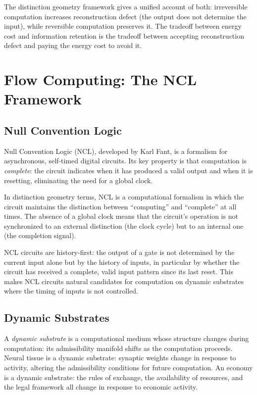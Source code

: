 \documentclass[12pt,a4paper]{book}
\theoremstyle{remark}
\theoremstyle{definition}
\begin{document}
The distinction geometry framework gives a unified account of both:
irreversible computation increases reconstruction defect (the output
does not determine the input), while reversible computation preserves
it. The tradeoff between energy cost and information retention is the
tradeoff between accepting reconstruction defect and paying the energy
cost to avoid it.

\chapter{Flow Computing: The NCL Framework}

\section{Null Convention Logic}

Null Convention Logic (NCL), developed by Karl Fant, is a formalism for
asynchronous, self-timed digital circuits. Its key property is that
computation is \emph{complete}: the circuit indicates when it has
produced a valid output and when it is resetting, eliminating the need
for a global clock.

In distinction geometry terms, NCL is a computational formalism in which
the circuit maintains the distinction between ``computing'' and
``complete'' at all times. The absence of a global clock means that the
circuit's operation is not synchronized to an external distinction
(the clock cycle) but to an internal one (the completion signal).

NCL circuits are history-first: the output of a gate is not determined
by the current input alone but by the history of inputs, in particular
by whether the circuit has received a complete, valid input pattern since
its last reset. This makes NCL circuits natural candidates for
computation on dynamic substrates where the timing of inputs is not
controlled.

\section{Dynamic Substrates}

A \emph{dynamic substrate} is a computational medium whose structure
changes during computation: its admissibility manifold shifts as the
computation proceeds. Neural tissue is a dynamic substrate: synaptic
weights change in response to activity, altering the admissibility
conditions for future computation. An economy is a dynamic substrate:
the rules of exchange, the availability of resources, and the legal
framework all change in response to economic activity.
\end{document}
